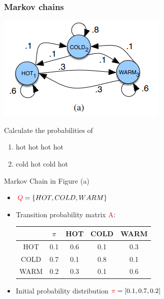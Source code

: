 \documentclass[13.5pt,aspecratio=169]{beamer}
\begin{document}
\begin{frame}
    \onehalfspacing
        \frametitle{Markov chains}
        
        \begin{minipage}{0.5\textwidth}
            \includegraphics[scale=0.7]{Example_1.png}

            {
            \begin{minipage}{0.85\textwidth}
            \begin{block}{Calculate the probabilities of}
                \begin{enumerate}
                    \item hot hot hot hot
                    \item cold hot cold hot
                \end{enumerate}
            \end{block}
            \end{minipage}

            }
        \end{minipage}
        \begin{minipage}{0.49\textwidth}
            \begin{block}{}
                Markov Chain in Figure (a)
            \end{block}

            \begin{itemize}
                \item $\textcolor{red}{Q} = \{HOT, COLD, WARM \} $ 
                \item Transition probability matrix \textcolor{red}{A}: 
                \hspace*{-1cm}
                {
                \small
                \begin{tabular}{c|cccc}
                    $ $ & $\pi$ & HOT & COLD & WARM \\
                    \hline
                    HOT & 0.1 & 0.6 & 0.1 & 0.3 \\
                    COLD & 0.7 & 0.1 & 0.8 & 0.1\\
                    WARM & 0.2 & 0.3 & 0.1 & 0.6 \\
                \end{tabular}
                }
                \item Initial probability distribution $\textcolor{red}{\pi} = [0.1,0.7,0.2]$
                

\end{itemize}
\end{minipage}
\end{frame}
\end{document}
